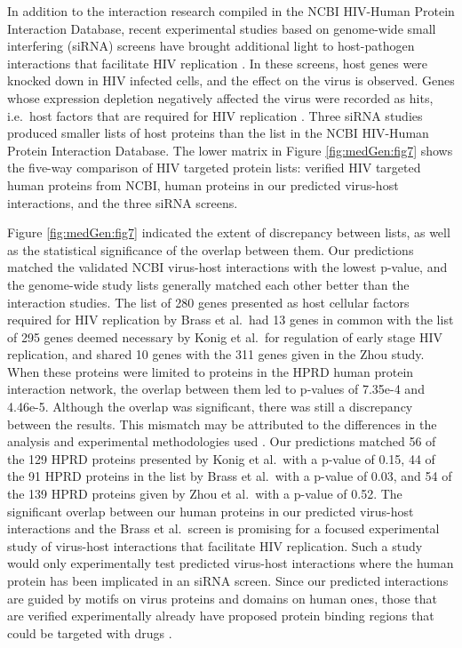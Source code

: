 In addition to the interaction research compiled in the NCBI HIV-Human
Protein Interaction Database, recent experimental studies based on
genome-wide small interfering (siRNA) screens have brought additional
light to host-pathogen interactions that facilitate HIV replication
\cite{brass08,konig08,zhou08}. In these screens, host genes were
knocked down in HIV infected cells, and the effect on the virus is
observed. Genes whose expression depletion negatively affected the
virus were recorded as hits, i.e.\, host factors that are required for
HIV replication \cite{bushman09}. Three siRNA studies produced smaller
lists of host proteins than the list in the NCBI HIV-Human Protein
Interaction Database. The lower matrix in Figure \ref{fig:medGen:fig7}
shows the five-way comparison of HIV targeted protein lists: verified
HIV targeted human proteins from NCBI, human proteins in our predicted
virus-host interactions, and the three siRNA screens.

Figure \ref{fig:medGen:fig7} indicated the extent of discrepancy
between lists, as well as the statistical significance of the overlap
between them. Our predictions matched the validated NCBI virus-host
interactions with the lowest p-value, and the genome-wide study lists
generally matched each other better than the interaction studies. The
list of 280 genes presented as host cellular factors required for HIV
replication by Brass et al.\ had 13 genes in common with the list of
295 genes deemed necessary by Konig et al.\ for regulation of early
stage HIV replication, and shared 10 genes with the 311 genes given in
the Zhou study. When these proteins were limited to proteins in the
HPRD human protein interaction network, the overlap between them led
to p-values of 7.35e-4 and 4.46e-5. Although the overlap was
significant, there was still a discrepancy between the results. This
mismatch may be attributed to the differences in the analysis and
experimental methodologies used \cite{bushman09}. Our predictions
matched 56 of the 129 HPRD proteins presented by Konig et al.\ with a
p-value of 0.15, 44 of the 91 HPRD proteins in the list by Brass et
al.\ with a p-value of 0.03, and 54 of the 139 HPRD proteins given by
Zhou et al.\ with a p-value of 0.52. The significant overlap between
our human proteins in our predicted virus-host interactions and the
Brass et al.\ screen is promising for a focused experimental study of
virus-host interactions that facilitate HIV replication. Such a study
would only experimentally test predicted virus-host interactions where
the human protein has been implicated in an siRNA screen. Since our
predicted interactions are guided by motifs on virus proteins and
domains on human ones, those that are verified experimentally already
have proposed protein binding regions that could be targeted with
drugs \cite{parthasarathi2008approved}.

